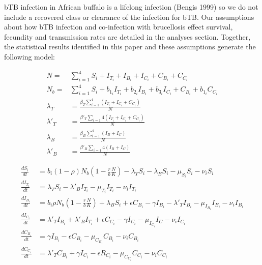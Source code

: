 \documentclass[letterpaper,12pt]{article}
\begin{document}
bTB infection in African buffalo is a lifelong infection (Bengis 1999) so we do not include a recovered class or clearance of the infection for bTB.  
Our assumptions about how bTB infection and co-infection with brucellosis effect survival, fecundity and transmission rates are detailed in the analyses section.  
Together, the statistical results identified in this paper and these assumptions generate the following model: 

\begin{align*}%
N=& \sum_{i=1} ^{4} S_i+I_{T_i}+I_{B_i}+ I_{C_i}+ C_{B_i} + C_{C_i} \\
N_{b}=& \sum_{i=1} ^{4} S_i+b_{1_i} I_{T_i}+ b_{2_i} I_{B_i}+ b_{3_i} I_{C_i} + C_{B_i} + b_{1_i} C_{C_i} \\
\lambda_T &= \frac{ \beta_T \sum_{i=1}^{4} (I_{T_i} + I_{C_i} + C_{C_i})}{N} \\
\lambda'_{T} &= \frac{ \beta'_T \sum_{i=1}{4} (I_{T_i} + I_{C_i} + C_{C_i})}{N} \\
\lambda_B &= \frac{\beta_B \sum_{i=1}^{4} (I_B+I_C)}{N} \\
\lambda'_{B} &= \frac{\beta'_{B} \sum_{i=1}{4} (I_B+I_C)}{N} 
\end{align*}

\begin{align}
\frac{dS_i}{dt} &= b_i (1-\rho) N_{b} \left(1-\frac{r}{b} \frac{N}{K}\right)  - \lambda_T S_i - \lambda_B S_i - \mu_{S_i} S_i - \nu_i S_i\\
\frac{dI_{T_i}}{dt}&= \lambda_T S_i -  \lambda'_{B} I_{T_i} - \mu_{T_i} I_{T_i} - \nu_i I_{T_i} \\
\frac{dI_{B_i}}{dt}&=  b_i \rho N_b \left(1-\frac{r}{b}\frac{N}{K}\right) + \lambda_B S_i + \epsilon C_{B_i} - \gamma I_{B_i} - \lambda'_T  I_{B_i} - \mu_{I_{B_i}} I_{B_i} - \nu_i I_{B_i}  \\
\frac{dI_{C_i}}{dt}&=   \lambda'_T I_{B_i} + \lambda'_B I_{T_i}+ \epsilon C_{C_i} - \gamma I_{C_i} - \mu_{I_{C_i}} I_C - \nu_i I_{C_i} \\
\frac{dC_{B_i}}{dt}&= \gamma I_{B_i} - \epsilon C_{B_i} - \mu_{C_{B_i}} C_{B_i} - \nu_i C_{B_i} \\
\frac{dC_{C_i}}{dt}&= \lambda'_T C_{B_i} + \gamma I_{C_i} - \epsilon R_{C_i} - \mu_{C_{C_i}} C_{C_i} -  \nu_i C_{C_i}\\
\end{align}
\end{document}
